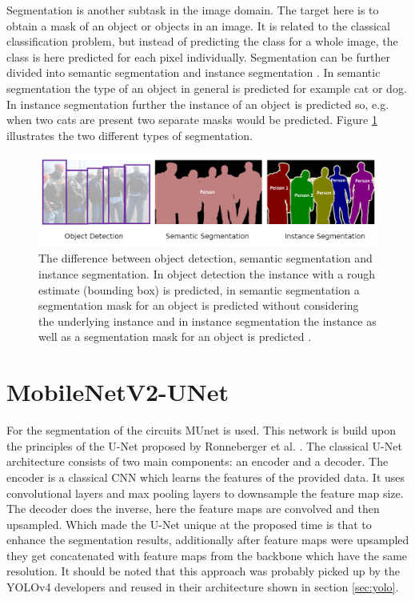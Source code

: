 \label{sec:segmentation}

Segmentation is another subtask in the image domain.
The target here is to obtain a mask of an object or objects in an image.
It is related to the classical classification problem, but instead of predicting the class for a whole image, the class is here predicted for each pixel individually.
Segmentation can be further divided into semantic segmentation \cite{semantic_segmentation} and instance segmentation \cite{mask_rcnn}.
In semantic segmentation the type of an object in general is predicted for example cat or dog.
In instance segmentation further the instance of an object is predicted so, e.g. when two cats are present two separate masks would be predicted.
Figure \ref{fig:instance_vs_semantic} illustrates the two different types of segmentation.

\begin{figure}
\begin{center}
    \includegraphics[width=16cm]{imgs/instance_vs_semantic_seg.png}
    \caption{The difference between object detection, semantic segmentation and instance segmentation. In object detection the instance with a rough estimate (bounding box) is predicted, in semantic segmentation a segmentation mask for an object is predicted without considering the underlying instance and in instance segmentation the instance as well as a segmentation mask for an object is predicted \cite{instance_vs_semantic_fig}.}
    \label{fig:instance_vs_semantic}
\end{center}
\end{figure}

\section{MobileNetV2-UNet}
\label{sec:mobilenetv2_unet}

For the segmentation of the circuits \ac{MUnet} \cite{mobile_unet} is used.
This network is build upon the principles of the U-Net proposed by Ronneberger et al. \cite{unet}.
The classical U-Net architecture consists of two main components: an encoder and a decoder.
The encoder is a classical \ac{CNN} which learns the features of the provided data.
It uses convolutional layers and max pooling layers to downsample the feature map size.
The decoder does the inverse, here the feature maps are convolved and then upsampled.
Which made the U-Net unique at the proposed time is that to enhance the segmentation results, additionally after feature maps were upsampled they get concatenated with feature maps from the backbone which have the same resolution.
It should be noted that this approach was probably picked up by the \ac{YOLOv4} developers and reused in their architecture shown in section \ref{sec:yolo}.

